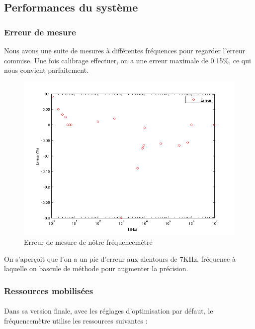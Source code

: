 \documentclass[a4paper,11pt]{article}
\begin{document}
  

\subsection{Performances du système}

\subsubsection{Erreur de mesure}
Nous avons une suite de mesures à différentes fréquences pour regarder l'erreur commise. Une fois calibrage effectuer, on a une erreur maximale
de 0.15\%, ce qui nous convient parfaitement.  
\begin{figure}[H]
\begin{center}
	\includegraphics[scale=.7]{mesure_erreur.png}
	\caption{Erreur de mesure de nôtre fréquencemètre}
\end{center}
\end{figure}
On s'aperçoit que l'on a un pic d'erreur aux alentours de 7KHz, fréquence à laquelle on bascule de méthode pour augmenter la précision.

\subsubsection{Ressources mobilisées}

\paragraph{} Dans sa version finale, avec les réglages d'optimisation par défaut, le fréquencemètre utilise les ressources suivantes :
\end{document}
